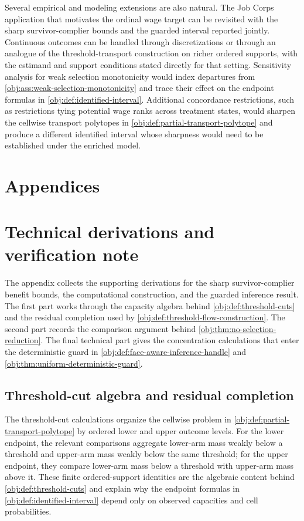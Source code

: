 \documentclass[11pt]{article}
\begin{document}
Several empirical and modeling extensions are also natural.  The Job Corps application that motivates the ordinal wage target can be revisited with the sharp survivor-complier bounds and the guarded interval reported jointly.  Continuous outcomes can be handled through discretizations or through an analogue of the threshold-transport construction on richer ordered supports, with the estimand and support conditions stated directly for that setting.  Sensitivity analysis for weak selection monotonicity would index departures from \cref{obj:ass:weak-selection-monotonicity} and trace their effect on the endpoint formulas in \cref{obj:def:identified-interval}.  Additional concordance restrictions, such as restrictions tying potential wage ranks across treatment states, would sharpen the cellwise transport polytopes in \cref{obj:def:partial-transport-polytope} and produce a different identified interval whose sharpness would need to be established under the enriched model.


\appendix

\section*{Appendices}

\section{Technical derivations and verification note}

The appendix collects the supporting derivations for the sharp survivor-complier benefit bounds, the computational construction, and the guarded inference result.  The first part works through the capacity algebra behind \cref{obj:def:threshold-cuts} and the residual completion used by \cref{obj:def:threshold-flow-construction}.  The second part records the comparison argument behind \cref{obj:thm:no-selection-reduction}.  The final technical part gives the concentration calculations that enter the deterministic guard in \cref{obj:def:face-aware-inference-handle} and \cref{obj:thm:uniform-deterministic-guard}.

\subsection{Threshold-cut algebra and residual completion}

The threshold-cut calculations organize the cellwise problem in \cref{obj:def:partial-transport-polytope} by ordered lower and upper outcome levels.  For the lower endpoint, the relevant comparisons aggregate lower-arm mass weakly below a threshold and upper-arm mass weakly below the same threshold; for the upper endpoint, they compare lower-arm mass below a threshold with upper-arm mass above it.  These finite ordered-support identities are the algebraic content behind \cref{obj:def:threshold-cuts} and explain why the endpoint formulas in \cref{obj:def:identified-interval} depend only on observed capacities and cell probabilities.
\end{document}
